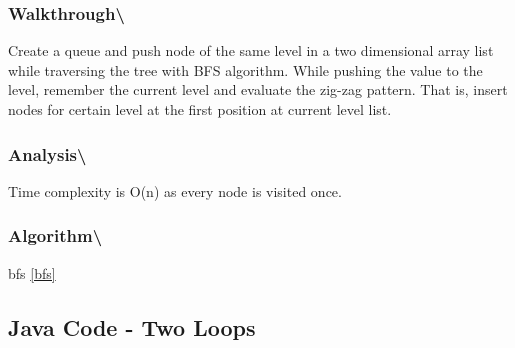 \documentclass[]{book}
\begin{document}
\hypertarget{walkthrough-59}{%
\subsubsection{Walkthrough\textbackslash{}}\label{walkthrough-59}}

Create a queue and push node of the same level in a two dimensional array list while traversing the tree with
BFS algorithm. While pushing the value to the level, remember the current level and evaluate the zig-zag pattern.
That is, insert nodes for certain level at the first position at current level list.

\hypertarget{analysis-66}{%
\subsubsection{Analysis\textbackslash{}}\label{analysis-66}}

Time complexity is O(n) as every node is visited once.

\hypertarget{algorithm-68}{%
\subsubsection{Algorithm\textbackslash{}}\label{algorithm-68}}

bfs \ref{bfs}

\hypertarget{java-code---two-loops-1}{%
\subsection{Java Code - Two Loops}\label{java-code---two-loops-1}}
\end{document}
